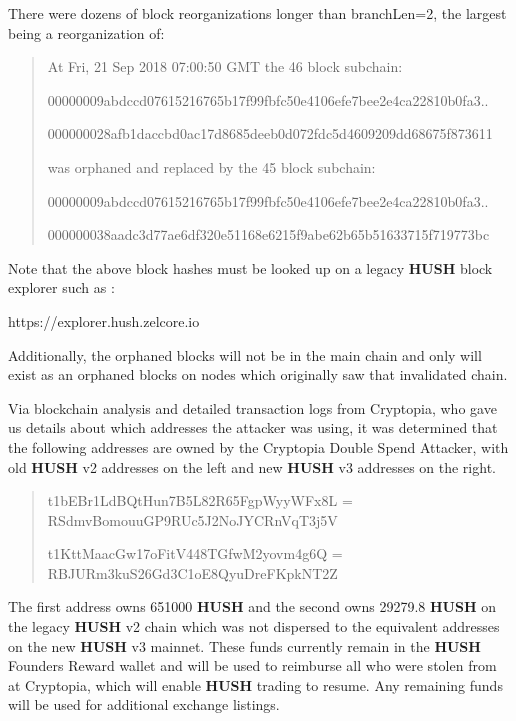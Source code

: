\documentclass{article}
\newcommand{\termbf}[1]{\textbf{#1}\xspace}
\newcommand{\HUSH}{\termbf{HUSH}}
\begin{document}
There were dozens of block reorganizations longer than branchLen=2, the largest
being a reorganization of:

\begin{quote}

At Fri, 21 Sep 2018 07:00:50 GMT the 46 block subchain:

00000009abdccd07615216765b17f99fbfc50e4106efe7bee2e4ca22810b0fa3..

000000028afb1daccbd0ac17d8685deeb0d072fdc5d4609209dd68675f873611

was orphaned and replaced by the 45 block subchain:

00000009abdccd07615216765b17f99fbfc50e4106efe7bee2e4ca22810b0fa3..

000000038aadc3d77ae6df320e51168e6215f9abe62b65b51633715f719773bc

\end{quote}

Note that the above block hashes must be looked up on a legacy \HUSH block
explorer such as :

https://explorer.hush.zelcore.io

Additionally, the orphaned blocks will not be in the main chain and only will
exist as an orphaned blocks on nodes which originally saw that invalidated chain.

Via blockchain analysis and detailed transaction logs from Cryptopia, who gave
us details about which addresses the attacker was using, it was determined that
the following addresses are owned by the Cryptopia Double Spend Attacker, with
old \HUSH v2 addresses on the left and new \HUSH v3 addresses on the right.

\begin{quote}

t1bEBr1LdBQtHun7B5L82R65FgpWyyWFx8L = RSdmvBomouuGP9RUc5J2NoJYCRnVqT3j5V

t1KttMaacGw17oFitV448TGfwM2yovm4g6Q = RBJURm3kuS26Gd3C1oE8QyuDreFKpkNT2Z

\end{quote}

The first address owns 651000 \HUSH and the second owns 29279.8 \HUSH on the
legacy \HUSH v2 chain which was not dispersed to the equivalent addresses on the
new \HUSH v3 mainnet. These funds currently remain in the \HUSH Founders Reward
wallet and will be used to reimburse all who were stolen from at Cryptopia,
which will enable \HUSH trading to resume. Any remaining funds will be used for
additional exchange listings.
\end{document}
